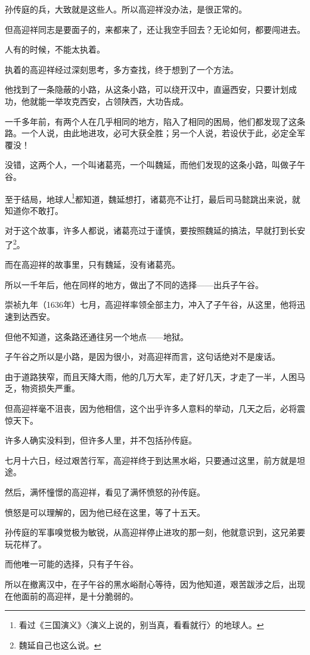 \begin{multicols}{\theparacolNo}
孙传庭的兵，大致就是这些人。所以高迎祥没办法，是很正常的。

但高迎祥同志是要面子的，来都来了，还让我空手回去？无论如何，都要闯进去。

人有的时候，不能太执着。

执着的高迎祥经过深刻思考，多方查找，终于想到了一个方法。

他找到了一条隐蔽的小路，从这条小路，可以绕开汉中，直逼西安，只要计划成功，他就能一举攻克西安，占领陕西，大功告成。

一千多年前，有两个人在几乎相同的地方，陷入了相同的困局，他们都发现了这条路。一个人说，由此地进攻，必可大获全胜；另一个人说，若设伏于此，必定全军覆没！

没错，这两个人，一个叫诸葛亮，一个叫魏延，而他们发现的这条小路，叫做子午谷。

至于结局，地球人\footnote{看过《三国演义》〈演义上说的，别当真，看看就行〉的地球人。}都知道，魏延想打，诸葛亮不让打，最后司马懿跳出来说，就知道你不敢打。

对于这个故事，许多人都说，诸葛亮过于谨慎，要按照魏延的搞法，早就打到长安了\footnote{魏延自己也这么说。}。

而在高迎祥的故事里，只有魏延，没有诸葛亮。

所以一千年后，他在同样的地方，做出了不同的选择——出兵子午谷。

崇祯九年（1636年）七月，高迎祥率领全部主力，冲入了子午谷，从这里，他将迅速到达西安。

但他不知道，这条路还通往另一个地点——地狱。

子午谷之所以是小路，是因为很小，对高迎祥而言，这句话绝对不是废话。

由于道路狭窄，而且天降大雨，他的几万大军，走了好几天，才走了一半，人困马乏，物资损失严重。

但高迎祥毫不沮丧，因为他相信，这个出乎许多人意料的举动，几天之后，必将震惊天下。

许多人确实没料到，但许多人里，并不包括孙传庭。

七月十六日，经过艰苦行军，高迎祥终于到达黑水峪，只要通过这里，前方就是坦途。

然后，满怀憧憬的高迎祥，看见了满怀愤怒的孙传庭。

愤怒是可以理解的，因为他已经在这里，等了十五天。

孙传庭的军事嗅觉极为敏锐，从高迎祥停止进攻的那一刻，他就意识到，这兄弟要玩花样了。

而他唯一可能的选择，只有子午谷。

所以在撤离汉中，在子午谷的黑水峪耐心等待，因为他知道，艰苦跋涉之后，出现在他面前的高迎祥，是十分脆弱的。


\end{multicols}
